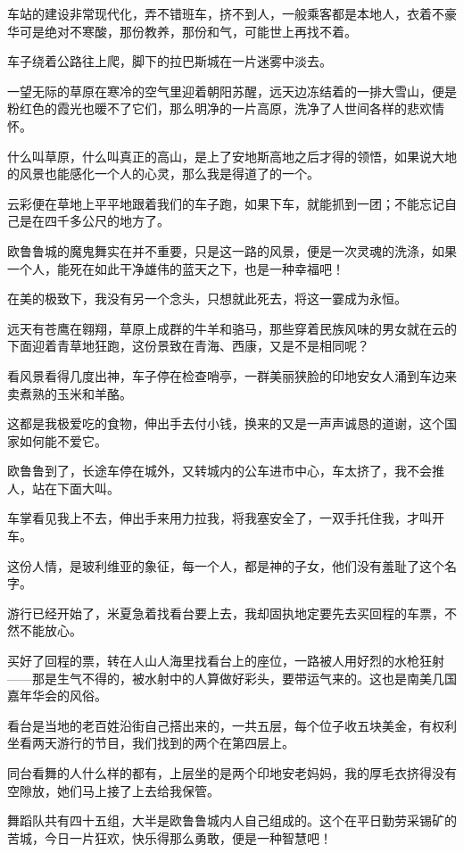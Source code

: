 \par 车站的建设非常现代化，弄不错班车，挤不到人，一般乘客都是本地人，衣着不豪华可是绝对不寒酸，那份教养，那份和气，可能世上再找不着。
\par 车子绕着公路往上爬，脚下的拉巴斯城在一片迷雾中淡去。
\par 一望无际的草原在寒冷的空气里迎着朝阳苏醒，远天边冻结着的一排大雪山，便是粉红色的霞光也暖不了它们，那么明净的一片高原，洗净了人世间各样的悲欢情怀。
\par 什么叫草原，什么叫真正的高山，是上了安地斯高地之后才得的领悟，如果说大地的风景也能感化一个人的心灵，那么我是得道了的一个。
\par 云彩便在草地上平平地跟着我们的车子跑，如果下车，就能抓到一团；不能忘记自己是在四千多公尺的地方了。
\par 欧鲁鲁城的魔鬼舞实在并不重要，只是这一路的风景，便是一次灵魂的洗涤，如果一个人，能死在如此干净雄伟的蓝天之下，也是一种幸福吧！
\par 在美的极致下，我没有另一个念头，只想就此死去，将这一霎成为永恒。
\par 远天有苍鹰在翱翔，草原上成群的牛羊和骆马，那些穿着民族风味的男女就在云的下面迎着青草地狂跑，这份景致在青海、西康，又是不是相同呢？
\par 看风景看得几度出神，车子停在检查哨亭，一群美丽狭脸的印地安女人涌到车边来卖煮熟的玉米和羊酪。
\par 这都是我极爱吃的食物，伸出手去付小钱，换来的又是一声声诚恳的道谢，这个国家如何能不爱它。
\par 欧鲁鲁到了，长途车停在城外，又转城内的公车进市中心，车太挤了，我不会推人，站在下面大叫。
\par 车掌看见我上不去，伸出手来用力拉我，将我塞安全了，一双手托住我，才叫开车。
\par 这份人情，是玻利维亚的象征，每一个人，都是神的子女，他们没有羞耻了这个名字。
\par 游行已经开始了，米夏急着找看台要上去，我却固执地定要先去买回程的车票，不然不能放心。
\par 买好了回程的票，转在人山人海里找看台上的座位，一路被人用好烈的水枪狂射——那是生气不得的，被水射中的人算做好彩头，要带运气来的。这也是南美几国嘉年华会的风俗。
\par 看台是当地的老百姓沿街自己搭出来的，一共五层，每个位子收五块美金，有权利坐看两天游行的节目，我们找到的两个在第四层上。
\par 同台看舞的人什么样的都有，上层坐的是两个印地安老妈妈，我的厚毛衣挤得没有空隙放，她们马上接了上去给我保管。
\par 舞蹈队共有四十五组，大半是欧鲁鲁城内人自己组成的。这个在平日勤劳采锡矿的苦城，今日一片狂欢，快乐得那么勇敢，便是一种智慧吧！
